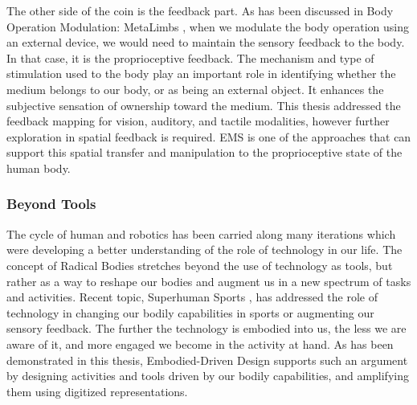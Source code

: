 The other side of the coin is the feedback part. As has been discussed in Body Operation Modulation: MetaLimbs , when we modulate the body operation using an external device, we would need to maintain the sensory feedback to the body. In that case, it is the proprioceptive feedback. The mechanism and type of stimulation used to the body play an important role in identifying whether the medium belongs to our body, or as being an external object. It enhances the subjective sensation of ownership toward the medium. This thesis addressed the feedback mapping for vision, auditory, and tactile modalities, however further exploration in spatial feedback is required. EMS is one of the approaches that can support this spatial transfer and manipulation to the proprioceptive state of the human body.

\subsubsection*{Beyond Tools}

The cycle of human and robotics has been carried along many iterations which were developing a better understanding of the role of technology in our life. The concept of Radical Bodies stretches beyond the use of technology as tools, but rather as a way to reshape our bodies and augment us in a new spectrum of tasks and activities. Recent topic, Superhuman Sports \cite{kunze2017superhuman}, has addressed the role of technology in changing our bodily capabilities in sports or augmenting our sensory feedback. The further the technology is embodied into us, the less we are aware of it, and more engaged we become in the activity at hand. As has been demonstrated in this thesis, Embodied-Driven Design supports such an argument by designing activities and tools driven by our bodily capabilities, and amplifying them using digitized representations.



